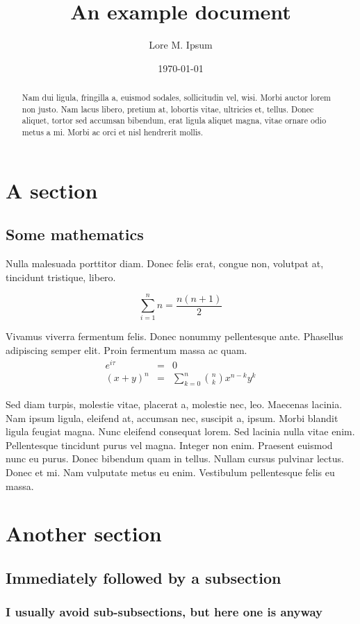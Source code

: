 \documentclass{rntz}
\title{An example document}
\author{Lore M. Ipsum}
\date{\today}
\begin{document}
\maketitle

\begin{abstract}
  Nam dui ligula, fringilla a, euismod sodales, sollicitudin vel, wisi. Morbi
  auctor lorem non justo. Nam lacus libero, pretium at, lobortis vitae,
  ultricies et, tellus. Donec aliquet, tortor sed accumsan bibendum, erat ligula
  aliquet magna, vitae ornare odio metus a mi. Morbi ac orci et nisl hendrerit
  mollis.
\end{abstract}

\section{A section}
\lipsum[4]

\subsection{Some mathematics}

Nulla malesuada porttitor diam. Donec felis erat, congue non, volutpat at,
tincidunt tristique, libero.

\[ \sum_{i=1}^n n = \frac{n(n+1)}{2} \]

Vivamus viverra fermentum felis. Donec nonummy pellentesque ante. Phasellus
adipiscing semper elit. Proin fermentum massa ac quam.
%
\begin{eqnarray}
  e^{i\tau} &=& 0\\
  (x+y)^n &=& \sum_{k=0}^n \binom{n}{k} x^{n-k} y^k
\end{eqnarray}

Sed diam turpis, molestie vitae, placerat a, molestie nec, leo. Maecenas lacinia. Nam ipsum ligula, eleifend at, accumsan nec, suscipit a, ipsum. Morbi blandit ligula feugiat magna. Nunc eleifend consequat lorem. Sed lacinia nulla vitae enim. Pellentesque tincidunt purus vel magna. Integer non enim. Praesent euismod nunc eu purus. Donec bibendum quam in tellus. Nullam cursus pulvinar lectus. Donec et mi. Nam vulputate metus eu enim. Vestibulum pellentesque felis eu massa.

\section{Another section}
\subsection{Immediately followed by a subsection}

\lipsum[6]

\subsubsection{I usually avoid sub-subsections, but here one is anyway}

\lipsum[7-8]
\end{document}
